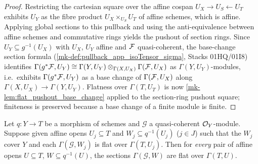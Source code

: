 \begin{proof}
  \leanok
  Restricting the cartesian square over the affine cospan
  \(U_X \to U_S \leftarrow U_T\) exhibits \(U_Y\) as the fibre product
  \(U_X \times_{U_S} U_T\) of affine schemes, which is affine.  Applying
  global sections to this pullback and using the anti-equivalence between
  affine schemes and commutative rings yields the pushout of section rings.
  Since \(U_Y \subseteq g^{-1}(U_X)\) with \(U_X\), \(U_Y\) affine and
  \(\mathcal{F}\) quasi-coherent, the base-change section formula
  (\ref{mk-def:pullback_app_isoTensor_sigma}, Stacks 01HQ/01I8) identifies
  \(\Gamma(g^* \mathcal{F}, U_Y) \cong
    \Gamma(Y, U_Y) \otimes_{\Gamma(X, U_X)} \Gamma(\mathcal{F}, U_X)\)
  as \(\Gamma(Y, U_Y)\)-modules, i.e.\ exhibits \(\Gamma(g^*\mathcal{F}, U_Y)\) as a
  base change of \(\Gamma(\mathcal{F}, U_X)\) along
  \(\Gamma(X, U_X) \to \Gamma(Y, U_Y)\).  Flatness over \(\Gamma(T, U_T)\)
  is now \ref{mk-lem:flat_pushout_base_change} applied to the section-ring
  pushout square; finiteness is preserved because a base change of a finite
  module is finite.
\end{proof}

\begin{lemma}

\label{mk-lem:flat_affine_local}
  \leanok

  Let \(q : Y \to T\) be a morphism of schemes and \(\mathcal G\) a quasi-coherent
  \(\mathcal{O}_Y\)-module.  Suppose given affine opens
  \(U_j \subseteq T\) and \(W_j \subseteq q^{-1}(U_j)\) (\(j \in J\)) such
  that the \(W_j\) cover \(Y\) and each \(\Gamma(\mathcal G, W_j)\) is flat over
  \(\Gamma(T, U_j)\).  Then for \emph{every} pair of affine opens
  \(U \subseteq T\), \(W \subseteq q^{-1}(U)\), the sections
  \(\Gamma(\mathcal G, W)\) are flat over \(\Gamma(T, U)\).
\end{lemma}

